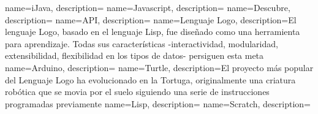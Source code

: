 
%



{
        name=iJava,
        description={}
}
{
        name=Javascript,
        description={}
}
{
        name=Descubre,
        description={}
}
{
        name=API,
        description={}
}
{
        name=Lenguaje Logo,
        description={El lenguaje Logo, basado en el lenguaje Lisp, fue diseñado como una herramienta para aprendizaje. Todas sus características -interactividad, modularidad, extensibilidad, flexibilidad en los tipos de datos- persiguen esta meta}
}
{
        name=Arduino,
        description={}
}
{
        name=Turtle,
        description={El proyecto más popular del Lenguaje Logo ha evolucionado en la Tortuga, originalmente una criatura robótica que se movia por el suelo siguiendo una serie de instrucciones programadas previamente}
}
{
        name=Lisp,
        description={}
}
{
        name=Scratch,
        description={}
}

